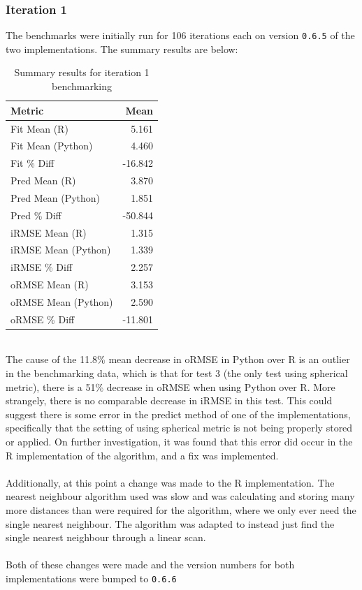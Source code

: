 \documentclass[11pt,twoside,a4paper]{article}
\begin{document}
\subsubsection{Iteration 1}
The benchmarks were initially run for 106 iterations each on version \texttt{0.6.5} of the two implementations. The summary results are below:
\begin{table}[h]
\begin{center}
\begin{tabular}{|l|r|}
\hline
\textbf{Metric} & \textbf{Mean}\\
\hline\hline
Fit Mean (R) & 5.161\\
\hline
Fit Mean (Python) & 4.460\\
\hline
Fit \% Diff & -16.842\\
\hline\hline
Pred Mean (R) & 3.870\\
\hline
Pred Mean (Python) & 1.851\\
\hline
Pred \% Diff & -50.844\\
\hline\hline
iRMSE Mean (R) & 1.315\\
\hline
iRMSE Mean (Python) & 1.339\\
\hline
iRMSE \% Diff & 2.257\\
\hline\hline
oRMSE Mean (R) & 3.153\\
\hline
oRMSE Mean (Python) & 2.590\\
\hline
oRMSE \% Diff & -11.801\\
\hline
\end{tabular}
\caption{Summary results for iteration 1 benchmarking}
\end{center}
\end{table}
\\
The cause of the 11.8\% mean decrease in oRMSE in Python over R is an outlier in the benchmarking data, which is that for test 3 (the only test using spherical metric), there is a 51\% decrease in oRMSE when using Python over R. More strangely, there is no comparable decrease in iRMSE in this test. This could suggest there is some error in the predict method of one of the implementations, specifically that the setting of using spherical metric is not being properly stored or applied. On further investigation, it was found that this error did occur in the R implementation of the algorithm, and a fix was implemented.
\\\\
Additionally, at this point a change was made to the R implementation. The nearest neighbour algorithm used was slow and was calculating and storing many more distances than were required for the algorithm, where we only ever need the single nearest neighbour. The algorithm was adapted to instead just find the single nearest neighbour through a linear scan.\\\\
Both of these changes were made and the version numbers for both implementations were bumped to \texttt{0.6.6}
\end{document}
